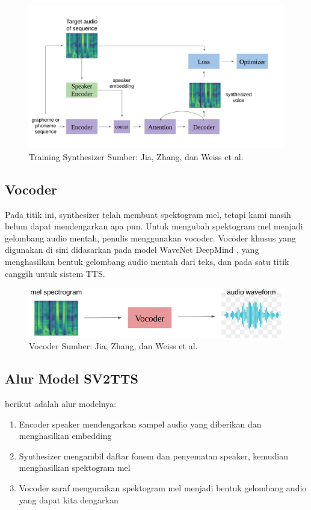 \begin{figure}[H]
        \centerline{\includegraphics[scale=.35]{figures/train}}
        \caption{Training Synthesizer Sumber: Jia, Zhang, dan Weiss et al.}
		\label{train}
\end{figure}

\subsection{Vocoder}
Pada titik ini, synthesizer telah membuat spektogram mel, tetapi kami masih belum dapat mendengarkan apa pun. Untuk mengubah spektogram mel menjadi gelombang audio mentah, penulis menggunakan vocoder.
Vocoder khusus yang digunakan di sini didasarkan pada model WaveNet DeepMind , yang menghasilkan bentuk gelombang audio mentah dari teks, dan pada satu titik canggih untuk sistem TTS.
\begin{figure}[H]
        \centerline{\includegraphics[scale=.35]{figures/vocoder}}
        \caption{Vocoder Sumber: Jia, Zhang, dan Weiss et al.}
		\label{vocoder}
\end{figure}


\subsection{Alur Model SV2TTS}
berikut adalah alur modelnya:
\begin{enumerate}
\item Encoder speaker mendengarkan sampel audio yang diberikan dan menghasilkan embedding
\item Synthesizer mengambil daftar fonem dan penyematan speaker, kemudian menghasilkan spektogram mel
\item Vocoder saraf menguraikan spektogram mel menjadi bentuk gelombang audio yang dapat kita dengarkan
\end{enumerate}


